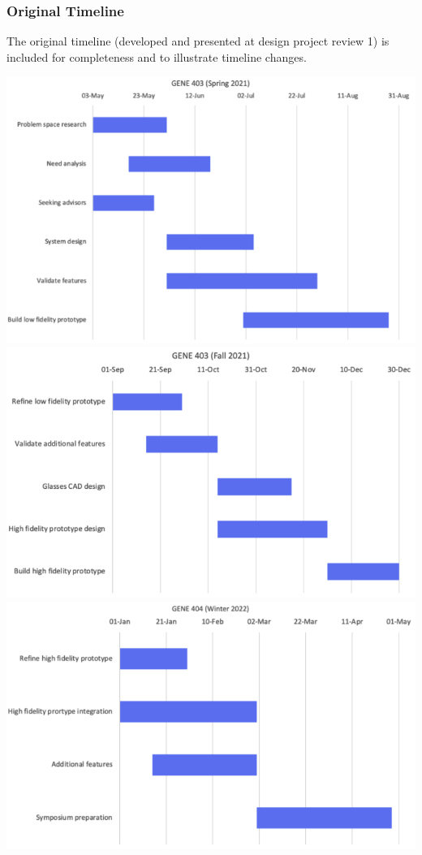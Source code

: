 \documentclass[a4paper,11pt]{article}
\begin{document}
\subsubsection{Original Timeline}
The original timeline (developed and presented at design project review 1) is included for completeness and to illustrate timeline changes.
\begin{center}
    \includegraphics[width={0.5\linewidth}]{img/s21-timeline.png}
    \includegraphics[width={0.5\linewidth}]{img/f21-timeline.png}
    \includegraphics[width={0.6\linewidth}]{img/w22-timeline.png}
\end{center}
\end{document}
